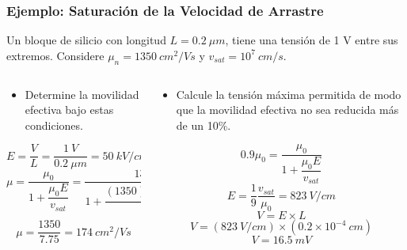 \documentclass[10pt,t,aspectratio=169]{beamer}
\begin{document}
\begin{frame}[t]
    \frametitle{Ejemplo: Saturación de la Velocidad de Arrastre}

    Un bloque de silicio con longitud $L=0.2\ \mu{}m$, tiene una tensión de 1 V entre sus extremos. Considere $\mu_n=1350\ cm^2/Vs$ y $v_{sat}=10^7\ cm/s$.

    \begin{columns}
    
        \begin{column}{0.5\textwidth}
        
            \begin{itemize}
                \item Determine la movilidad efectiva bajo estas condiciones.
            \end{itemize}
            
            \[ E = \dfrac{V}{L} = \dfrac{1\ V}{0.2\ \mu{}m} = 50\ kV/cm \]
            \[ \mu = \dfrac{\mu_0}{1 + \dfrac{\mu_0E}{v_{sat}}} = \dfrac{1350}{1 + \dfrac{(1350)(50\times{}10^3)}{(10^7)}} \]
            \[ \mu = \dfrac{1350}{7.75} = 174\ cm^2/Vs \]
            
        \end{column}
        
        \begin{column}{0.5\textwidth}
        
            \begin{itemize}
                \item Calcule la tensión máxima permitida de modo que la movilidad efectiva no sea reducida más de un 10\%.
            \end{itemize}
            
            \[ 0.9\mu_0 = \dfrac{\mu_0}{1 + \dfrac{\mu_0E}{v_{sat}}} \]
            \[ E = \dfrac{1}{9}\dfrac{v_{sat}}{\mu_0} = 823\ V/cm \]
            \[ V = E \times{} L \]
            \[ V = (823\ V/cm) \times{} (0.2\times{}10^{-4}\ cm) \]
            \[ V = 16.5\ mV \]
            
        \end{column}
        
    \end{columns}
    
\end{frame}
\end{document}

